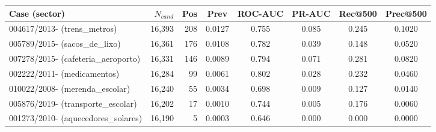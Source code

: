 \begin{tabular}{lrrccccc}
\toprule
Case (sector) & $N_{cand}$ & Pos & Prev & ROC-AUC & PR-AUC & Rec@500 & Prec@500 \\
\midrule
004617/2013- (trens\_metros) & 16,393 & 208 & 0.0127 & 0.755 & 0.085 & 0.245 & 0.1020 \\
005789/2015- (sacos\_de\_lixo) & 16,361 & 176 & 0.0108 & 0.782 & 0.039 & 0.148 & 0.0520 \\
007278/2015- (cafeteria\_aeroporto) & 16,331 & 146 & 0.0089 & 0.794 & 0.071 & 0.281 & 0.0820 \\
002222/2011- (medicamentos) & 16,284 & 99 & 0.0061 & 0.802 & 0.028 & 0.232 & 0.0460 \\
010022/2008- (merenda\_escolar) & 16,240 & 55 & 0.0034 & 0.698 & 0.009 & 0.127 & 0.0140 \\
005876/2019- (transporte\_escolar) & 16,202 & 17 & 0.0010 & 0.744 & 0.005 & 0.176 & 0.0060 \\
001273/2010- (aquecedores\_solares) & 16,190 & 5 & 0.0003 & 0.646 & 0.000 & 0.000 & 0.0000 \\
\bottomrule
\end{tabular}
